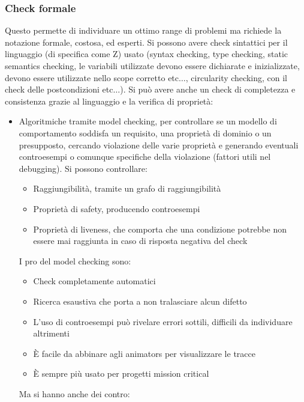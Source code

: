 \subsubsection{Check formale}
Questo permette di individuare un ottimo range di problemi ma richiede la notazione
formale, costosa, ed esperti. Si possono avere check sintattici per il linguaggio
(di specifica come Z) usato (syntax checking, type checking, static semantics
checking, le variabili utilizzate devono essere dichiarate e inizializzate,
devono essere utilizzate nello scope corretto etc$\dots$, circularity checking,
con il check delle postcondizioni etc$\dots$). Si può avere anche un check di
completezza e consistenza grazie al linguaggio e la verifica di proprietà:
\begin{itemize}
    \item Algoritmiche tramite model checking, per controllare se un modello di
          comportamento soddisfa un requisito, una proprietà di dominio o un presupposto,
          cercando violazione delle varie proprietà e generando eventuali controesempi
          o comunque specifiche della violazione (fattori utili nel debugging).
          Si possono controllare:
          \begin{itemize}
              \item Raggiungibilità, tramite un grafo di raggiungibilità
              \item Proprietà di safety, producendo controesempi
              \item Proprietà di liveness, che comporta che una condizione potrebbe
                    non essere mai raggiunta in caso di risposta negativa del check
          \end{itemize}
          I pro del model checking sono:
          \begin{itemize}
              \item Check completamente automatici
              \item Ricerca esaustiva che porta a non tralasciare alcun difetto
              \item L'uso di controesempi può rivelare errori sottili, difficili
                    da individuare altrimenti
              \item È facile da abbinare agli animators per visualizzare le tracce
              \item È sempre più usato per progetti mission critical
          \end{itemize}
          Ma si hanno anche dei contro:
          \begin{itemize}

\end{itemize}
\end{itemize}
